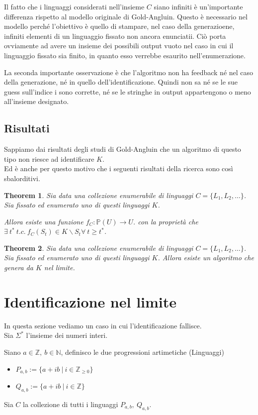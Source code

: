 \documentclass{report}
\newtheorem{theo}{Theorem}
\newenvironment{pop}{}{}
\begin{document}
\begin{pop}
  Il fatto che i linguaggi considerati nell'insieme $C$ siano infiniti è un'importante differenza rispetto 
al modello originale di Gold-Angluin. Questo è necessario nel modello perché l'obiettivo è quello 
di stampare, nel caso della generazioene, infiniti elementi di un linguaggio fissato non ancora enunciatii. 
Ciò porta ovviamente ad avere un insieme dei possibili output vuoto
nel caso in cui il linguaggio fissato sia finito, in quanto esso verrebbe esaurito nell'enumerazione. 

  La seconda importante osservazione è che l'algoritmo non ha feedback né nel caso della generazione,
né in quello dell'identificazione. 
Quindi non sa né se le sue guess sull'indice i sono corrette,
né se le stringhe in output appartengono o meno all'insieme designato.
\end{pop}

\section{Risultati}
\begin{pop}
  Sappiamo dai risultati degli studi di Gold-Angluin che un algoritmo di questo tipo non riesce ad identificare $K$. \\ 
  Ed è anche per questo motivo che i seguenti risultati della ricerca sono così sbalorditivi. 
\end{pop}
\begin{theo}
  Sia data una collezione enumerabile di linguaggi $C=\{L_1,L_2,\dots\}$. 
  Sia fissato ed enumerato uno di questi linguaggi $K$.

  Allora esiste una funzione $f_C : \mathds{P}(U) \rightarrow U $. 
  con la proprietà che $\exists \ t^* \ t.c.\ f_C (S_t) \in K\backslash S_t \forall \ t \geq t^* $. 
\end{theo}
\begin{theo}
  Sia data una collezione enumerabile di linguaggi $C=\{L_1,L_2,\dots\}$. 
  Sia fissato ed enumerato uno di questi linguaggi $K$. 
  Allora esiste un algoritmo che genera da $K$ nel limite.
\end{theo}

\chapter{Identificazione nel limite}
\begin{pop}
  In questa sezione vediamo un caso in cui l'identificazione fallisce. \\ 
  Sia $\Sigma^*$ l'insieme dei numeri interi.

  Siano $a \in \mathds{Z}, \ b \in \mathds{N}$, definisco le due progressioni artimetiche (Linguaggi) 
  \begin{itemize}
    \item   $P_{a,b}:= \{ a+ib \ | \ i \in \mathds{Z}_{\geq 0} \} $
    \item $Q_{a,b} := \{ a+ib \ | \ i \in \mathds{Z} \}$
  \end{itemize}
  
  Sia $C$ la collezione di tutti i linguaggi $P_{a,b}, \ Q_{a,b}$.
\end{pop}
\end{document}
